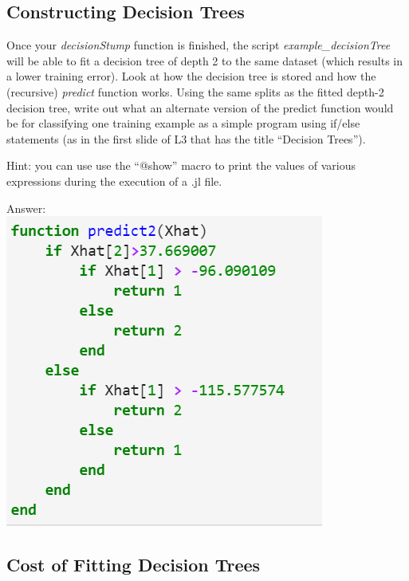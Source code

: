 \documentclass{article}
\def\ans#1{\par\gre{Answer: #1}}
\def\blu#1{{\color{blu}#1}}
\def\gre#1{{\color{gre}#1}}
\begin{document}
\subsection{Constructing Decision Trees}

Once your \emph{decisionStump} function is finished, the script \emph{example\_decisionTree} will be able to fit a decision tree of depth 2 to the same dataset (which results in a lower training error). Look at how the decision tree is stored and how the (recursive) \emph{predict} function works. \blu{Using the same splits as the fitted depth-2 decision tree, write out what an alternate version of the predict function would be for classifying one training example as a simple program using if/else statements (as in the first slide of L3 that has the title ``Decision Trees'').}

Hint: you can use use the ``@show'' macro to print the values of various expressions during the execution of a .jl file.
\ans{\\
    \includegraphics{DecTreeEquivalent.PNG}
}
\subsection{Cost of Fitting Decision Trees}
\end{document}
